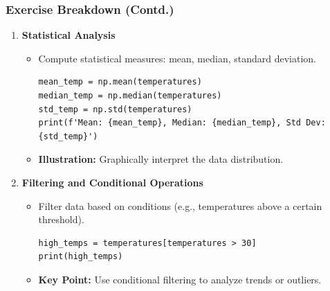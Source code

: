 \documentclass{beamer}
\begin{document}
\begin{frame}[fragile]
    \frametitle{Exercise Breakdown (Contd.)}
    \begin{enumerate}[resume]
        \item \textbf{Statistical Analysis}
        \begin{itemize}
            \item Compute statistical measures: mean, median, standard deviation.
            \begin{lstlisting}
mean_temp = np.mean(temperatures)
median_temp = np.median(temperatures)
std_temp = np.std(temperatures)
print(f'Mean: {mean_temp}, Median: {median_temp}, Std Dev: {std_temp}')
            \end{lstlisting}
            \item \textbf{Illustration:} Graphically interpret the data distribution.
        \end{itemize}
        
        \item \textbf{Filtering and Conditional Operations}
        \begin{itemize}
            \item Filter data based on conditions (e.g., temperatures above a certain threshold).
            \begin{lstlisting}
high_temps = temperatures[temperatures > 30]
print(high_temps)
            \end{lstlisting}
            \item \textbf{Key Point:} Use conditional filtering to analyze trends or outliers.
        \end{itemize}
    \end{enumerate}
\end{frame}
\end{document}
